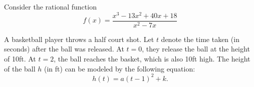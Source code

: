 \begin{questions}
\newpage


\question  %
  Consider the rational function     
    \begin{equation*}
       f(x)= \dfrac{x^3-13 x^2+40 x+18}{ x^2-7x}
    \end{equation*}

\newpage

\question  
    A basketball player throws a half court shot. Let $t$ denote the time taken (in seconds) after the ball was released. At $t=0$, they release the ball at the height of 10ft. At $t=2$, the ball reaches the basket, which is also 10ft high. The height of the ball $h$ (in ft) can be modeled by the following equation: \[h(t)=a(t-1)^2+k.\]
\end{questions}
